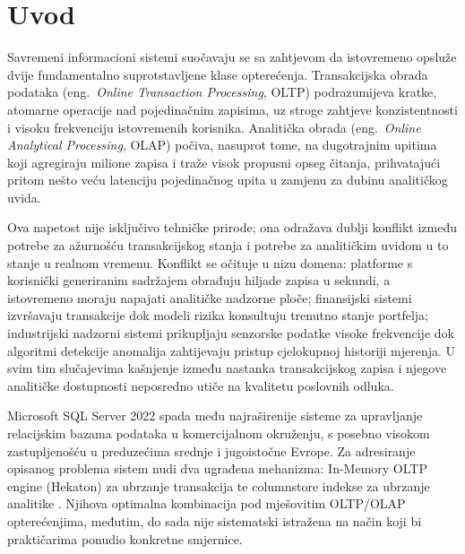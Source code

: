 {}
\chapter*{Uvod}
\label{ch:uvod}

Savremeni informacioni sistemi suočavaju se sa zahtjevom da istovremeno opsluže dvije fundamentalno suprotstavljene klase opterećenja. Transakcijska obrada podataka (eng.\ \textit{Online Transaction Processing}, OLTP) podrazumijeva kratke, atomarne operacije nad pojedinačnim zapisima, uz stroge zahtjeve konzistentnosti i visoku frekvenciju istovremenih korisnika. Analitička obrada (eng.\ \textit{Online Analytical Processing}, OLAP) počiva, nasuprot tome, na dugotrajnim upitima koji agregiraju milione zapisa i traže visok propusni opseg čitanja, prihvatajući pritom nešto veću latenciju pojedinačnog upita u zamjenu za dubinu analitičkog uvida.

Ova napetost nije isključivo tehničke prirode; ona odražava dublji konflikt između potrebe za ažurnošću transakcijskog stanja i potrebe za analitičkim uvidom u to stanje u realnom vremenu. Konflikt se očituje u nizu domena: platforme s korisnički generiranim sadržajem obrađuju hiljade zapisa u sekundi, a istovremeno moraju napajati analitičke nadzorne ploče; finansijski sistemi izvršavaju transakcije dok modeli rizika konsultuju trenutno stanje portfelja; industrijski nadzorni sistemi prikupljaju senzorske podatke visoke frekvencije dok algoritmi detekcije anomalija zahtijevaju pristup cjelokupnoj historiji mjerenja. U svim tim slučajevima kašnjenje između nastanka transakcijskog zapisa i njegove analitičke dostupnosti neposredno utiče na kvalitetu poslovnih odluka.

Microsoft SQL Server 2022 spada među najraširenije sisteme za upravljanje relacijskim bazama podataka u komercijalnom okruženju, s posebno visokom zastupljenošću u preduzećima srednje i jugoistočne Evrope. Za adresiranje opisanog problema sistem nudi dva ugrađena mehanizma: In-Memory OLTP engine (Hekaton) za ubrzanje transakcija \cite{diaconu2013hekaton} te columnstore indekse za ubrzanje analitike \cite{larson2013columnstore}. Njihova optimalna kombinacija pod mješovitim OLTP/OLAP opterećenjima, međutim, do sada nije sistematski istražena na način koji bi praktičarima ponudio konkretne smjernice.

